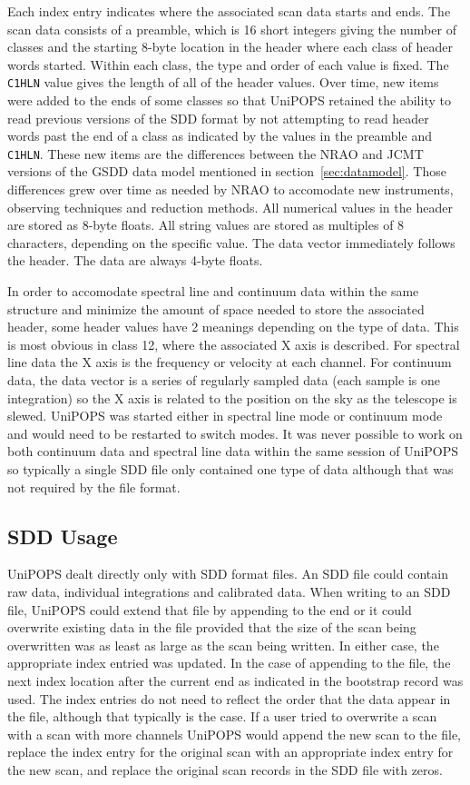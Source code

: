 \documentclass[final,authoryear,5p,times,twocolumn]{elsarticle}
\begin{document}
Each index entry indicates where the associated scan data starts and
ends.  The scan data consists of a preamble, which is 16 short
integers giving the number of classes and the starting 8-byte location
in the header where each class of header words started.  Within each
class, the type and order of each value is fixed.  The \texttt{C1HLN}
value gives the length of all of the header values.  Over time, new
items were added to the ends of some classes so that UniPOPS retained
the ability to read previous versions of the SDD format by not
attempting to read header words past the end of a class as indicated
by the values in the preamble and \texttt{C1HLN}.  These new items are the
differences between the NRAO and JCMT versions of the GSDD data model
mentioned in section~\ref{sec:datamodel}.  Those differences grew over time
as needed by NRAO to accomodate new instruments, observing techniques and
reduction methods. All numerical
values in the header are stored as 8-byte floats.  All string values
are stored as multiples of 8 characters, depending on the specific
value.  The data vector immediately follows the header.  The data are
always 4-byte floats.

In order to accomodate spectral line and continuum data within the
same structure and minimize the amount of space needed to store the
associated header, some header values have 2 meanings depending on the
type of data.  This is most obvious in class 12, where the associated
X axis is described.  For spectral line data the X axis is the
frequency or velocity at each channel.  For
continuum data, the data vector is a series of regularly sampled
data (each sample is one integration) so the X axis is related to
the position on the sky as the telescope is slewed.  UniPOPS was
started either in spectral line mode or continuum mode and would need
to be restarted to switch modes.  It was never possible to work on
both continuum data and spectral line data within the same session of
UniPOPS so typically a single SDD file only contained one type of
data although that was not required by the file format.

\subsection{SDD Usage}

UniPOPS dealt directly only with SDD format files.  An SDD file could
contain raw data, individual integrations and calibrated data. When
writing to an SDD file, UniPOPS could extend that file by appending to
the end or it could overwrite existing data in the file provided that
the size of the scan being overwritten was as least as large as the
scan being written.  In either case, the appropriate index entried was
updated.  In the case of appending to the file, the next index
location after the current end as indicated in the bootstrap record
was used.  The index entries do not need to reflect the order that the
data appear in the file, although that typically is the case.  If a
user tried to overwrite a scan with a scan with more channels UniPOPS
would append the new scan to the file, replace the index entry for the
original scan with an appropriate index entry for the new scan, and
replace the original scan records in the SDD file with zeros.
\end{document}
